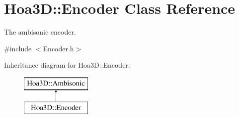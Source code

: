 \hypertarget{class_hoa3_d_1_1_encoder}{\section{Hoa3\-D\-:\-:Encoder Class Reference}
\label{class_hoa3_d_1_1_encoder}
}


The ambisonic encoder.  




{\ttfamily \#include $<$Encoder.\-h$>$}

Inheritance diagram for Hoa3\-D\-:\-:Encoder\-:\begin{figure}[H]
\begin{center}
\leavevmode
\includegraphics[height=2.000000cm]{class_hoa3_d_1_1_encoder}
\end{center}
\end{figure}
